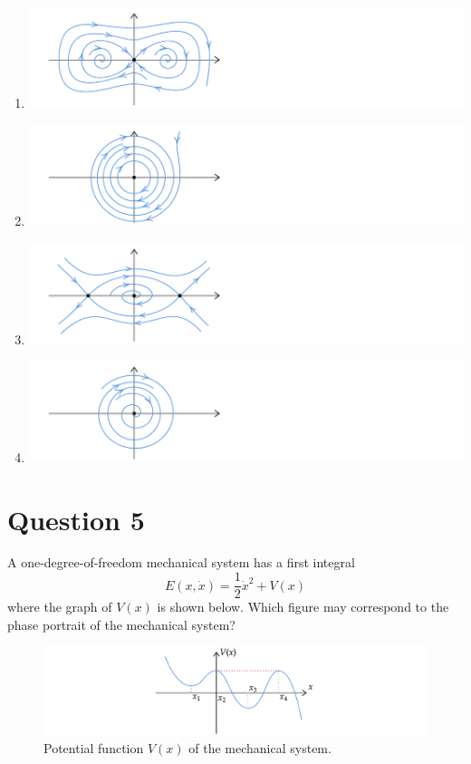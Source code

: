 \documentclass[twoside,10pt,a4paper]{article}
\begin{document}
\begin{enumerate}[label=(\alph*)]
	\item \includegraphics[scale=0.8]{Graphics/MCQ1_figures/Q18D01.pdf}
	\item \includegraphics[scale=0.8]{Graphics/MCQ1_figures/Q18D02.pdf}
	\item \includegraphics[scale=0.8]{Graphics/MCQ1_figures/Q18D03.pdf}
	\item \includegraphics[scale=0.8]{Graphics/MCQ1_figures/Q18D04.pdf}
\end{enumerate}

\section*{Question 5}
A one-degree-of-freedom mechanical system has a first integral
\begin{equation*}
	E(x, \dot{x}) = \frac{1}{2}\dot{x}^2 + V(x)
\end{equation*}
where the graph of $V(x)$ is shown below. Which figure may correspond to the phase portrait of the mechanical system?

\begin{figure}[H]
	\centering
	\includegraphics[scale=0.9]{Graphics/MCQ1_figures/Q21D01.pdf}
	\caption{Potential function $ V(x) $ of the mechanical system.}
\end{figure}
\end{document}
